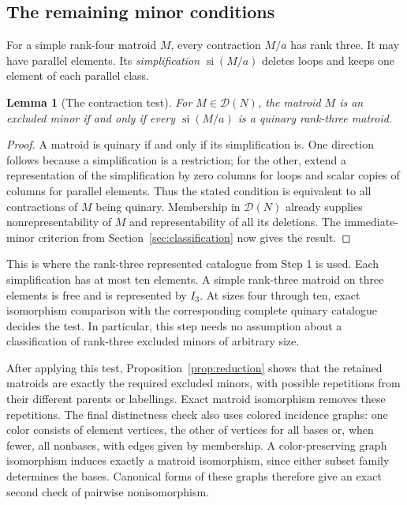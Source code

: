 \documentclass[11pt,a4paper]{article}
\newtheorem{lemma}[theorem]{Lemma}
\theoremstyle{definition}
\newcommand{\si}{\operatorname{si}}
\begin{document}
\subsection{The remaining minor conditions}

For a simple rank-four matroid $M$, every contraction $M/a$ has
rank three. It may have parallel elements. Its
\emph{simplification} $\si(M/a)$ deletes loops and keeps one
element of each parallel class.

\begin{lemma}[The contraction test]\label{lem:contractions}
For $M\in\mathcal D(N)$, the matroid $M$ is an excluded minor if
and only if every $\si(M/a)$ is a quinary rank-three matroid.
\end{lemma}
\begin{proof}
A matroid is quinary if and only if its simplification is. One
direction follows because a simplification is a restriction; for
the other, extend a representation of the simplification by zero
columns for loops and scalar copies of columns for parallel
elements. Thus the stated condition is equivalent to all
contractions of $M$ being quinary. Membership in $\mathcal D(N)$
already supplies nonrepresentability of $M$ and representability
of all its deletions. The immediate-minor criterion from
Section~\ref{sec:classification} now gives the result.
\end{proof}

This is where the rank-three represented catalogue from Step 1
is used. Each simplification has at most ten elements. A simple
rank-three matroid on three elements is free and is represented
by $I_3$. At sizes four through ten, exact isomorphism comparison
with the corresponding complete quinary catalogue decides the
test. In particular, this step needs no assumption about a
classification of rank-three excluded minors of arbitrary size.

After applying this test, Proposition~\ref{prop:reduction} shows
that the retained matroids are exactly the required excluded
minors, with possible repetitions from their different parents
or labellings. Exact matroid isomorphism removes these repetitions.
The final distinctness check also uses colored incidence graphs:
one color consists of element vertices, the other of vertices
for all bases or, when fewer, all nonbases, with edges given by
membership. A color-preserving graph isomorphism induces exactly
a matroid isomorphism, since either subset family determines the
bases. Canonical forms of these graphs therefore give an exact
second check of pairwise nonisomorphism.
\end{document}
